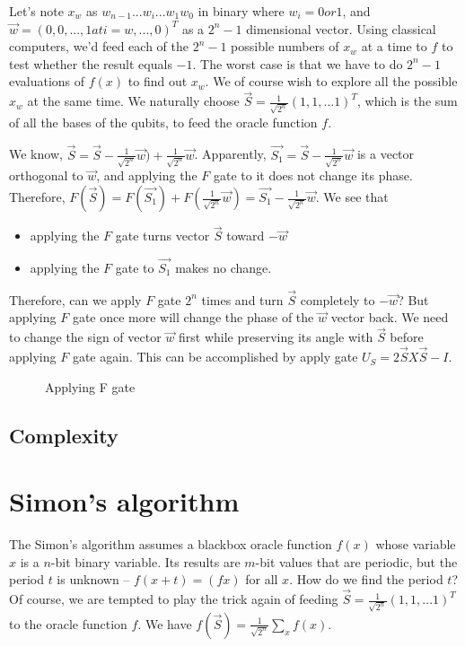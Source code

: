 \documentclass{book}
\begin{document}
Let's note $x_w$ as $w_{n-1}...w_i...w_1 w_0$ in binary where $w_i = 0 or 1$, and $\Vec{w} = (0, 0, ..., 1 at i=w, ..., 0)^T$ as a $2^n-1$ dimensional vector. Using classical computers, we'd feed each of the $2^n -1$ possible numbers of $x_w$ at a time to $f$ to test whether the result equals $-1$. The worst case is that we have to do $2^n-1$ evaluations of $f(x)$ to find out $x_w$. We of course wish to explore all the possible $x_w$ at the same time. We naturally choose $\vec{S} = \frac 1 {\sqrt{2^n}} (1, 1, ...1)^T$, which is the sum of all the bases of the qubits, to feed the oracle function $f$.

We know, $\vec{S} = \vec{S} - \frac 1 {\sqrt{2^n}} \vec{w}) + \frac 1  {\sqrt{2^n}} \vec{w}$. Apparently, $\vec{S_1}  = \vec{S} - \frac 1 {\sqrt{2^n}} \vec{w}$ is a vector orthogonal to $\vec{w}$, and applying the $F$ gate to it does not change its phase. Therefore, $F(\vec{S}) = F(\vec{S_1}) + F(\frac 1  {\sqrt{2^n}} \vec{w})  = \vec{S_1} - \frac 1 {\sqrt{2^n}} \vec{w}$. We see that 
\begin{itemize}
    \item applying the $F$ gate turns vector $\vec{S}$ toward $-\vec{w}$
    \item applying the $F$ gate to $\vec{S_1}$ makes no change.
\end{itemize}
Therefore, can we apply $F$ gate $2^n$ times and turn $\vec{S}$ completely to $-\vec{w}$? But applying $F$ gate once more will change the phase of the $\vec{w}$ vector back. We need to change the sign of vector $\vec{w}$ first while preserving its angle with $\vec{S}$ before applying $F$ gate again. This can be accomplished by apply gate $U_S = 2 \vec{S}X\vec{S} -I$.

\begin{figure}[ht]
\caption{Applying F gate}
\label{grover}
\end{figure}

\subsection{Complexity}

\section{Simon's algorithm}
The Simon's algorithm assumes a blackbox oracle function $f(x)$ whose variable $x$ is a $n$-bit binary variable. Its results are $m$-bit values that are periodic, but the period $t$ is unknown -- $f(x+t)=(fx)$ for all $x$. How do we find the period $t$? Of course, we are tempted to play the trick again of feeding $\vec{S} = \frac 1 {\sqrt{2^n}} (1, 1, ...1)^T$ to the oracle function $f$. We have
$f(\vec{S}) = \frac 1  {\sqrt{2^n}} \sum_x f(x)$.
\end{document}
